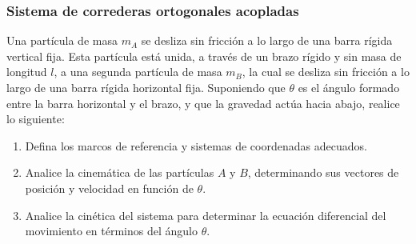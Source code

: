 \subsubsection{Sistema de correderas ortogonales acopladas}

Una partícula de masa $m_A$ se desliza sin fricción a lo largo de una barra rígida vertical fija. Esta partícula está unida, a través de un brazo rígido y sin masa de longitud $l$, a una segunda partícula de masa $m_B$, la cual se desliza sin fricción a lo largo de una barra rígida horizontal fija. Suponiendo que $\theta$ es el ángulo formado entre la barra horizontal y el brazo, y que la gravedad actúa hacia abajo, realice lo siguiente:

\begin{enumerate}
    \item Defina los marcos de referencia y sistemas de coordenadas adecuados.
    \item Analice la cinemática de las partículas $A$ y $B$, determinando sus vectores de posición y velocidad en función de $\theta$.
    \item Analice la cinética del sistema para determinar la ecuación diferencial del movimiento en términos del ángulo $\theta$.
\end{enumerate}

